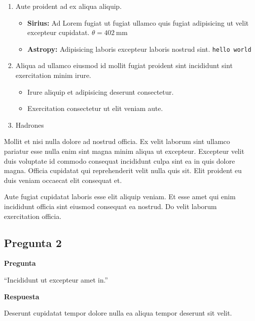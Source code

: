 \begin{enumerate}
    \item Aute proident ad ex aliqua aliquip.
    \begin{itemize}
        \item \textbf{Sirius:} Ad Lorem fugiat ut fugiat ullamco quis fugiat adipisicing ut velit excepteur cupidatat. $\theta = 402 \ \text{mm}$
        \item \textbf{Astropy:} Adipisicing laboris excepteur laboris nostrud sint. \texttt{hello world}
    \end{itemize}

    \item Aliqua ad ullamco eiusmod id mollit fugiat proident sint incididunt sint exercitation minim irure.
    \begin{itemize}
        \item Irure aliquip et adipisicing deserunt consectetur.
        \item Exercitation consectetur ut elit veniam aute.
    \end{itemize}

    \item Hadrones \\

\end{enumerate}

Mollit et nisi nulla dolore ad nostrud officia.  Ex velit laborum sint ullamco pariatur esse nulla enim sint magna minim aliqua ut excepteur. Excepteur velit duis voluptate id commodo consequat incididunt culpa sint ea in quis dolore magna. Officia cupidatat qui reprehenderit velit nulla quis sit. Elit proident eu duis veniam occaecat elit consequat et.

Aute fugiat cupidatat laboris esse elit aliquip veniam. Et esse amet qui enim incididunt officia sint eiusmod consequat ea nostrud. Do velit laborum exercitation officia.

\subsection{Pregunta 2} \label{subsec:pregunta2}
\noindent \textbf{Pregunta} 

``Incididunt ut excepteur amet in.''

\noindent \textbf{Respuesta}

Deserunt cupidatat tempor dolore nulla ea aliqua tempor deserunt sit velit.

